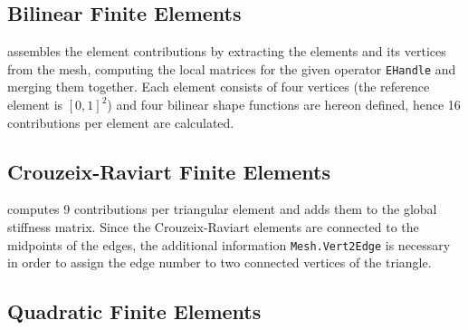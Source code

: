 \subsection{Bilinear Finite Elements} 

  assembles the element contributions by extracting the elements and its vertices from the mesh, computing the local matrices for the given operator {\tt EHandle} and merging them together. Each element consists of four vertices (the reference element is $[0,1]^2$) and four bilinear shape functions are hereon defined, hence 16 contributions per element are calculated.




\subsection{Crouzeix-Raviart Finite Elements} 

  computes 9 contributions per triangular element and adds them to the global stiffness matrix. Since the Crouzeix-Raviart elements are connected to the midpoints of the edges, the additional information {\tt Mesh.Vert2Edge} is necessary in order to assign the edge number to two connected vertices of the triangle.






\subsection{Quadratic Finite Elements} 

